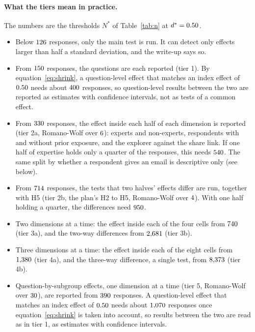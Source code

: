 \documentclass[11pt]{article}
\begin{document}
\paragraph{What the tiers mean in practice.} The numbers are the thresholds $N^{*}$ of
Table~\ref{tab:n} at $d^{*} = 0.50$.
\begin{itemize}
  \item Below $126$ responses, only the main test is run. It can detect only effects larger
  than half a standard deviation, and the write-up says so.
  \item From $150$ responses, the \KWord{} questions are each reported (tier 1). By
  equation~\eqref{eq:shrink}, a question-level effect that matches an index effect of $0.50$
  needs about $400$ responses, so question-level results between the two are reported
  as estimates with confidence intervals, not as tests of a common effect.
  \item From $330$ responses, the effect inside each half of each dimension is reported
  (tier 2a, Romano-Wolf over $6$): experts and non-experts, respondents with and without prior
  exposure, and the explorer against the share link. If one half of expertise holds only a quarter
  of the responses, this needs $540$. The same split by whether a respondent gives an
  email is descriptive only (see below).
  \item From $714$ responses, the tests that two halves' effects differ are run, together
  with H5 (tier 2b, the plan's H2 to H5, Romano-Wolf over $4$). With one half holding a
  quarter, the differences need $950$.
  \item Two dimensions at a time: the effect inside each of the four cells from $740$
  (tier 3a), and the two-way differences from $2{,}681$ (tier 3b).
  \item Three dimensions at a time: the effect inside each of the eight cells from
  $1{,}380$ (tier 4a), and the three-way difference, a single test, from
  $8{,}373$ (tier 4b).
  \item Question-by-subgroup effects, one dimension at a time (tier 5, Romano-Wolf over
  $30$), are reported from $390$ responses. A question-level effect that matches
  an index effect of $0.50$ needs about $1{,}070$ responses once
  equation~\eqref{eq:shrink} is taken into account, so results between the two are read as in
  tier 1, as estimates with confidence intervals.
\end{itemize}
\end{document}
